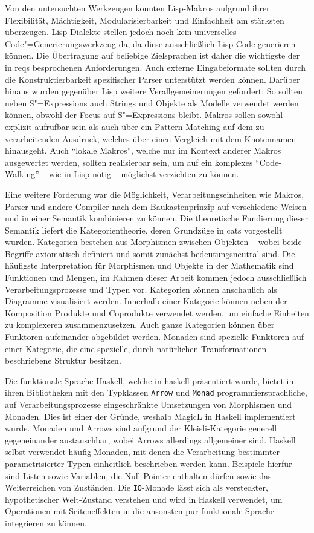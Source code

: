\documentclass[12pt, a4paper, bibgerm]{scrbook}
\newcommand\icode[1]{\lstinline?#1?}
\newcommand\cref{}
\newcommand{\sexps}{S"=Expressions}
\newcommand{\cgen}{Code"=Generierung}
\begin{document}
Von den untersuchten Werkzeugen konnten Lisp-Makros aufgrund ihrer
Flexibilität, Mächtigkeit, Modularisierbarkeit und Einfachheit am
stärksten überzeugen. Lisp-Dialekte stellen jedoch noch kein
universelles \cgen{}swerkzeug da, da diese ausschließlich Lisp-Code
generieren können. Die Übertragung auf beliebige Zielsprachen ist daher
die wichtigste der in \cref{reqs} besprochenen Anforderungen. Auch
externe Eingabeformate sollten durch die Konstruktierbarkeit
spezifischer Parser unterstützt werden können. Darüber hinaus wurden
gegenüber Lisp weitere Verallgemeinerungen gefordert: So sollten neben
\sexps{} auch Strings und Objekte als Modelle verwendet werden können,
obwohl der Focus auf \sexps{} bleibt. Makros sollen sowohl explizit
aufrufbar sein als auch über ein Pattern-Matching auf dem zu
verarbeitenden Ausdruck, welches über einen Vergleich mit dem
Knotennamen hinausgeht. Auch ``lokale Makros'', welche nur im Kontext
anderer Makros ausgewertet werden, sollten realisierbar sein, um auf ein
komplexes ``Code-Walking'' -- wie in Lisp nötig -- möglichst verzichten zu
können.

Eine weitere Forderung war die Möglichkeit, Verarbeitungseinheiten wie
Makros, Parser und andere Compiler nach dem Baukastenprinzip auf
verschiedene Weisen und in einer Semantik kombinieren zu können. Die
theoretische Fundierung dieser Semantik liefert die Kategorientheorie,
deren Grundzüge in \cref{cats} vorgestellt wurden. Kategorien bestehen
aus Morphismen zwischen Objekten -- wobei beide Begriffe axiomatisch
definiert und somit zunächst bedeutungsneutral sind. Die häufigste
Interpretation für Morphismen und Objekte in der Mathematik sind
Funktionen und Mengen, im Rahmen dieser Arbeit kommen jedoch
ausschließlich Verarbeitungsprozesse und Typen vor. Kategorien können
anschaulich als Diagramme visualisiert werden. Innerhalb einer Kategorie
können neben der Komposition Produkte und Coprodukte verwendet werden,
um einfache Einheiten zu komplexeren zusammenzusetzen. Auch ganze
Kategorien können über Funktoren aufeinander abgebildet werden. Monaden
sind spezielle Funktoren auf einer Kategorie, die eine spezielle, durch
natürlichen Transformationen beschriebene Struktur besitzen.

Die funktionale Sprache Haskell, welche in \cref{haskell} präsentiert
wurde, bietet in ihren Bibliotheken mit den Typklassen \icode{Arrow} und
\icode{Monad} programmiersprachliche, auf Verarbeitungsprozesse
eingeschränkte Umsetzungen von Morphismen und Monaden. Dies ist einer
der Gründe, weshalb MagicL in Haskell implementiert wurde. Monaden und
Arrows sind aufgrund der Kleisli-Kategorie generell gegeneinander
austauschbar, wobei Arrows allerdings allgemeiner sind. Haskell selbst
verwendet häufig Monaden, mit denen die Verarbeitung bestimmter
parametrisierter Typen einheitlich beschrieben werden kann. Beispiele
hierfür sind Listen sowie Variablen, die Null-Pointer enthalten dürfen
sowie das Weiterreichen von Zuständen. Die \icode{IO}-Monade lässt sich
als versteckter, hypothetischer Welt-Zustand verstehen und wird in
Haskell verwendet, um Operationen mit Seiteneffekten in die ansonsten
pur funktionale Sprache integrieren zu können.
\end{document}
